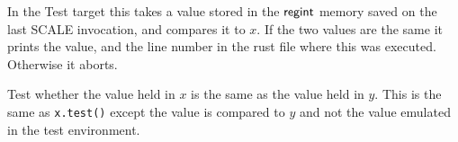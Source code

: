 In the Test target this takes a value stored in the $\mathsf{regint}$
memory saved on the last SCALE invocation, and compares it to
$x$. If the two values are the same it prints the value, and the
line number in the rust file where this was executed.
Otherwise it aborts.

Test whether the value held in $x$ is the same as the value held in $y$.
This is the same as \verb|x.test()| except the value is compared to
$y$ and not the value emulated in the test environment.
